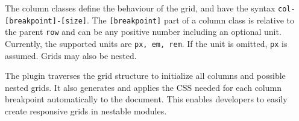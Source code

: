 \documentclass{llncs}
\newcommand{\code}[1]{\texttt{#1}}
\begin{document}
    The column classes define the behaviour of the grid, and have the syntax \code{col-[breakpoint]-[size]}.
    The \code{[breakpoint]} part of a column class is relative to the parent \code{row} and can be any positive number including an optional unit.
    Currently, the supported units are \code{px, em, rem}.
    If the unit is omitted, \code{px} is assumed.
    Grids may also be nested.

    The plugin traverses the grid structure to initialize all columns and possible nested grids.
    It also generates and applies the CSS needed for each column breakpoint automatically to the document.
    This enables developers to easily create responsive grids in nestable modules.
\end{document}
